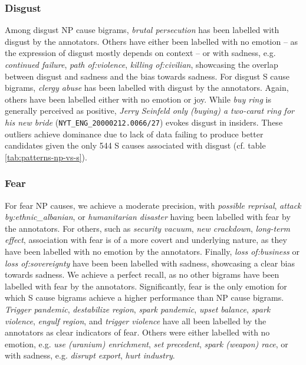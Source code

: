 \subsubsection{Disgust}

Among disgust NP cause bigrams, \textit{brutal persecution} has been labelled with disgust by the annotators. Others have either been labelled with no emotion -- as the expression of disgust mostly depends on context -- or with sadness, e.g. \textit{continued failure}, \textit{path of:violence}, \textit{killing of:civilian}, showcasing the overlap between disgust and sadness and the bias towards sadness. For disgust S cause bigrams, \textit{clergy abuse} has been labelled with disgust by the annotators. Again, others have been labelled either with no emotion or joy. While \textit{buy ring} is generally perceived as positive, \textit{Jerry Seinfeld only (buying) a two-carat ring for his new bride} (\texttt{NYT\_ENG\_20000212.0066/27}) evokes disgust in insiders. These outliers achieve dominance due to lack of data failing to produce better candidates given the only 544 S causes associated with disgust (cf. table \ref{tab:patterns-np-vs-s}).

\subsubsection{Fear}

For fear NP causes, we achieve a moderate precision, with \textit{possible reprisal}, \textit{attack by:ethnic\_albanian}, or \textit{humanitarian disaster} having been labelled with fear by the annotators. For others, such as \textit{security vacuum}, \textit{new crackdown}, \textit{long-term effect}, association with fear is of a more covert and underlying nature, as they have been labelled with no emotion by the annotators. Finally, \textit{loss of:business} or \textit{loss of:sovereignty} have been been labelled with sadness, showcasing a clear bias towards sadness. We achieve a perfect recall, as no other bigrams have been labelled with fear by the annotators.
Significantly, fear is the only emotion for which S cause bigrams achieve a higher performance than NP cause bigrams. \textit{Trigger pandemic}, \textit{destabilize region}, \textit{spark pandemic}, \textit{upset balance}, \textit{spark violence}, \textit{engulf region}, and \textit{trigger violence} have all been labelled by the annotators as clear indicators of fear. Others were either labelled with no emotion, e.g. \textit{use (uranium) enrichment}, \textit{set precedent}, \textit{spark (weapon) race}, or with sadness, e.g. \textit{disrupt export}, \textit{hurt industry}.

